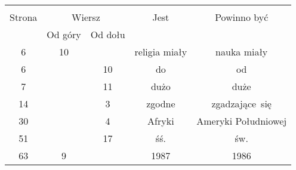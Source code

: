 \documentclass[a4paper,11pt]{article}
\begin{document}
\begin{center}

  \begin{tabular}{|c|c|c|c|c|}
    \hline
    & \multicolumn{2}{c|}{} & & \\
    Strona & \multicolumn{2}{c|}{Wiersz} & Jest
                              & Powinno być \\ \cline{2-3}
    & Od góry & Od dołu & & \\
    \hline
    6  & 10 & & religia miały & nauka miały \\
    6  & & 10 & do & od \\
    7  & & 11 & dużo & duże \\
    14 & &  3 & zgodne & zgadzające~się \\
    30 & &  4 & Afryki & Ameryki Południowej \\
    51 & & 17 & śś. & św. \\
    63 &  9 & & 1987 & 1986 \\
    \hline
  \end{tabular}

\end{center}

\vspace{\spaceTwo}






























 {}



\end{document}
